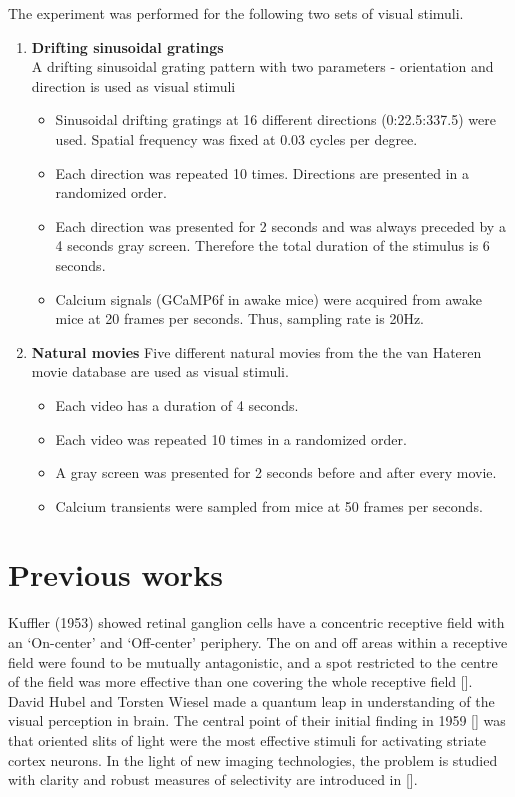 \documentclass[MTech]{iitmdiss}
\begin{document}
The experiment was performed for the following two sets of visual stimuli.
\begin{enumerate}
  \item \textbf{Drifting sinusoidal gratings}\\
  A drifting sinusoidal grating pattern with two parameters - orientation and direction is used as visual stimuli\\
  \begin{itemize}
    \item Sinusoidal drifting gratings at 16 different directions (0:22.5:337.5) were used. Spatial frequency was fixed at 0.03 cycles per degree.
    \item Each direction was repeated 10 times. Directions are presented in a randomized order.
    \item Each direction was presented for 2 seconds and was always preceded by a 4 seconds gray screen. Therefore the total duration of the stimulus is 6 seconds.
    \item Calcium signals (GCaMP6f in awake mice) were acquired from awake mice at 20 frames per seconds. Thus, sampling rate is 20Hz.
  \end{itemize}
  \item \textbf{Natural movies}
  Five different natural movies from the the van Hateren movie database are used as visual stimuli.\\
  \begin{itemize}
    \item Each video has a duration of 4 seconds.
    \item Each video was repeated 10 times in a randomized order.
    \item A gray screen was presented for 2 seconds before and after every movie.
    \item Calcium transients were sampled from mice at 50 frames per seconds.
  \end{itemize}
\end{enumerate}
\section{Previous works} %
\label{sec:previous_work}
Kuffler (1953) showed retinal ganglion cells have a concentric receptive field with an `On-center' and `Off-center' periphery. The on and off areas within a
receptive field were found to be mutually antagonistic, and a spot restricted
to the centre of the field was more effective than one covering the whole receptive field [\cite{barlow1957change}]. 
David Hubel and Torsten Wiesel made a quantum leap in understanding of the visual perception in brain. The central point of their initial finding in 1959 [\cite{hubel1959receptive}] was that oriented slits of light were the most effective stimuli for activating striate cortex neurons. In the light of new imaging technologies, the problem is studied with clarity and robust measures of selectivity are introduced in [\cite{mazurek2015robust}].
\end{document}
